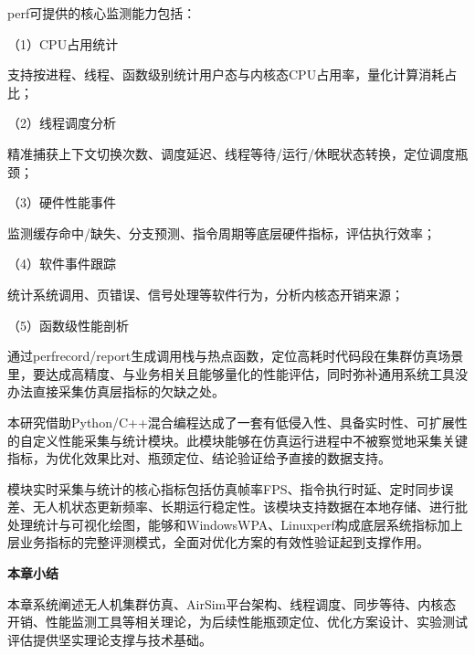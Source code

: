 perf可提供的核心监测能力包括：

（1）CPU占用统计

支持按进程、线程、函数级别统计用户态与内核态CPU占用率，量化计算消耗占比；

（2）线程调度分析

精准捕获上下文切换次数、调度延迟、线程等待/运行/休眠状态转换，定位调度瓶颈；

（3）硬件性能事件

监测缓存命中/缺失、分支预测、指令周期等底层硬件指标，评估执行效率；

（4）软件事件跟踪

统计系统调用、页错误、信号处理等软件行为，分析内核态开销来源；

（5）函数级性能剖析

通过perfrecord/report生成调用栈与热点函数，定位高耗时代码段在集群仿真场景里，要达成高精度、与业务相关且能够量化的性能评估，同时弥补通用系统工具没办法直接采集仿真层指标的欠缺之处。

本研究借助Python/C++混合编程达成了一套有低侵入性、具备实时性、可扩展性的自定义性能采集与统计模块。此模块能够在仿真运行进程中不被察觉地采集关键指标，为优化效果比对、瓶颈定位、结论验证给予直接的数据支持。

模块实时采集与统计的核心指标包括仿真帧率FPS、指令执行时延、定时同步误差、无人机状态更新频率、长期运行稳定性。该模块支持数据在本地存储、进行批处理统计与可视化绘图，能够和WindowsWPA、Linuxperf构成底层系统指标加上层业务指标的完整评测模式，全面对优化方案的有效性验证起到支撑作用。

\textbf{本章小结}

本章系统阐述无人机集群仿真、AirSim平台架构、线程调度、同步等待、内核态开销、性能监测工具等相关理论，为后续性能瓶颈定位、优化方案设计、实验测试评估提供坚实理论支撑与技术基础。
